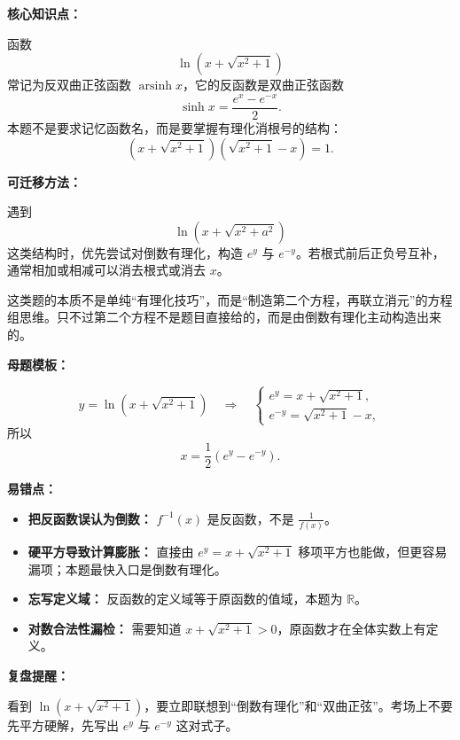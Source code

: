 \begin{knowledgeBox}
\textbf{核心知识点：}

函数
\[
\ln\left(x+\sqrt{x^2+1}\right)
\]
常记为反双曲正弦函数 \(\operatorname{arsinh}x\)，它的反函数是双曲正弦函数
\[
\sinh x=\frac{e^x-e^{-x}}{2}.
\]
本题不是要求记忆函数名，而是要掌握有理化消根号的结构：
\[
\left(x+\sqrt{x^2+1}\right)\left(\sqrt{x^2+1}-x\right)=1.
\]

\textbf{可迁移方法：}

遇到
\[
\ln\left(x+\sqrt{x^2+a^2}\right)
\]
这类结构时，优先尝试对倒数有理化，构造 \(e^y\) 与 \(e^{-y}\)。若根式前后正负号互补，通常相加或相减可以消去根式或消去 \(x\)。

这类题的本质不是单纯“有理化技巧”，而是“制造第二个方程，再联立消元”的方程组思维。只不过第二个方程不是题目直接给的，而是由倒数有理化主动构造出来的。

\textbf{母题模板：}

\[
y=\ln\left(x+\sqrt{x^2+1}\right)
\quad\Longrightarrow\quad
\begin{cases}
e^y=x+\sqrt{x^2+1},\\
e^{-y}=\sqrt{x^2+1}-x,
\end{cases}
\]
所以
\[
x=\frac12(e^y-e^{-y}).
\]
\end{knowledgeBox}

\begin{mistakeBox}
\textbf{易错点：}

\begin{itemize}
  \item \textbf{把反函数误认为倒数：} \(f^{-1}(x)\) 是反函数，不是 \(\frac{1}{f(x)}\)。
  \item \textbf{硬平方导致计算膨胀：} 直接由 \(e^y=x+\sqrt{x^2+1}\) 移项平方也能做，但更容易漏项；本题最快入口是倒数有理化。
  \item \textbf{忘写定义域：} 反函数的定义域等于原函数的值域，本题为 \(\mathbb{R}\)。
  \item \textbf{对数合法性漏检：} 需要知道 \(x+\sqrt{x^2+1}>0\)，原函数才在全体实数上有定义。
\end{itemize}

\textbf{复盘提醒：}

看到 \(\ln(x+\sqrt{x^2+1})\)，要立即联想到“倒数有理化”和“双曲正弦”。考场上不要先平方硬解，先写出 \(e^y\) 与 \(e^{-y}\) 这对式子。
\end{mistakeBox}

\par


